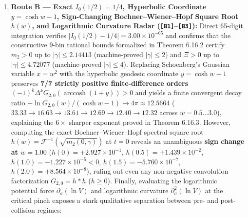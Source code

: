 \documentclass[
  11pt,
]{article}
\begin{document}
\begin{enumerate}
  An annealed nonlinear hyperbolic fixed-point search
  \(s_{t+1} = \tanh(\beta\, Q s_t)\) on
  \(Q = -W^{(1.60)} + \lambda_{\max} I\) (400 steps, normalized on the
  unit sphere) remains strictly inside the positive cone (Rayleigh
  quotient \(+4.052 \times 10^{-1} > 0\), overlap \(0.256\) with
  \(v_0^{(1.60)}\)), detecting zero violations.
\item
  \textbf{Route B --- Exact \(I_0(1/2) = 1/4\), Hyperbolic Coordinate
  \(y = \cosh w - 1\), Sign-Changing Bochner--Wiener--Hopf Square Root
  \(h(w)\), and Logarithmic Curvature Radar
  (\texttt{{[}B1{]}}--\texttt{{[}B3{]}}):} Direct 65-digit integration
  verifies \(|I_0(1/2) - 1/4| = 3.00 \times 10^{-65}\) and confirms that
  the constructive 9-bin rational bounds formalized in Theorem 6.16.2
  certify \(m_2 > 0\) up to \(|\gamma| \le 2.14413\) (machine-proved
  \(|\gamma| \le 2\)) and \(\Xi > 0\) up to \(|\gamma| \le 4.72077\)
  (machine-proved \(|\gamma| \le 4\)). Replacing Schoenberg's Gaussian
  variable \(x = w^2\) with the hyperbolic geodesic coordinate
  \(y = \cosh w - 1\) preserves \textbf{7/7 strictly positive
  finite-difference orders}
  \((-1)^k \Delta^k G_{2,0}(\operatorname{arccosh}(1+y)) > 0\) and
  yields a finite convergent decay ratio
  \(-\ln G_{2,0}(w)/(\cosh w - 1) \to 4\pi \approx 12.5664\)
  (\(33.33 \to 16.63 \to 13.61 \to 12.69 \to 12.40 \to 12.32\) across
  \(w = 0.5 \dots 3.0\)), explaining the \(6\times\) sharper exponent
  proved in Theorem 6.16.3. However, computing the exact
  Bochner--Wiener--Hopf spectral square root
  \(h(w) = \mathcal{F}^{-1}(\sqrt{m_2(0, \gamma)})\) at \(t = 0\)
  reveals an unambiguous \textbf{sign change at \(w = 1.00\)}
  (\(h(0) = +2.927 \times 10^{-1}\), \(h(0.5) = +1.439 \times 10^{-2}\),
  \textbf{\(h(1.0) = -1.227 \times 10^{-5} < 0\)},
  \(h(1.5) = -5.760 \times 10^{-7}\),
  \(h(2.0) = +8.564 \times 10^{-8}\)), ruling out even any non-negative
  convolution factorization \(G_{2,0} = h * h\) (\(h \ge 0\)). Finally,
  evaluating the logarithmic potential force \(\partial_\sigma(\ln V)\)
  and logarithmic curvature \(\partial_\sigma^2(\ln V)\) at the critical
  pinch exposes a stark qualitative separation between pre- and
  post-collision regimes:


\end{enumerate}
\end{document}
